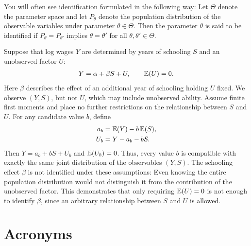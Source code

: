 \documentclass[a4paper,12pt]{article}
\begin{document}
\begin{remark}
	You will often see identification formulated in the following way:
	Let $\Theta$ denote the parameter space and let $P_\theta$ denote the population distribution of the observable variables under parameter $\theta\in\Theta$.
	Then the parameter $\theta$ is said to be identified if $P_\theta=P_{\theta'}$ implies $\theta=\theta'$ for all $\theta,\theta'\in\Theta$.
\end{remark}

\begin{example}\label{eg-identification-schooling}
	Suppose that log wages $Y$ are determined by years of schooling $S$ and an unobserved factor $U$:
	\begin{align}
		Y=\alpha+\beta S+U,
		\qquad \operatorname{\mathbb{E}}(U)=0.
	\end{align}
	Here $\beta$ describes the effect of an additional year of schooling holding $U$ fixed.
	We observe $(Y,S)$, but not $U$, which may include unobserved ability.
	Assume finite first moments and place no further restrictions on the relationship between $S$ and $U$.
	For any candidate value $b$, define
	\begin{align*}
		a_b&=\operatorname{\mathbb{E}}(Y)-b\operatorname{\mathbb{E}}(S),\\
		U_b&=Y-a_b-bS.
	\end{align*}
	Then $Y=a_b+bS+U_b$ and $\operatorname{\mathbb{E}}(U_b)=0$.
	Thus, every value $b$ is compatible with exactly the same joint distribution of the observables $(Y,S)$.
	The schooling effect $\beta$ is not identified under these assumptions:
	Even knowing the entire population distribution would not distinguish it from the contribution of the unobserved factor.
	This demonstrates that only requiring $\operatorname{\mathbb{E}}(U)=0$ is not enough to identify $\beta$,
	since an arbitrary relationship between $S$ and $U$ is allowed.
\end{example}

\vfill
\section*{Acronyms}
\printglossaries
\end{document}
